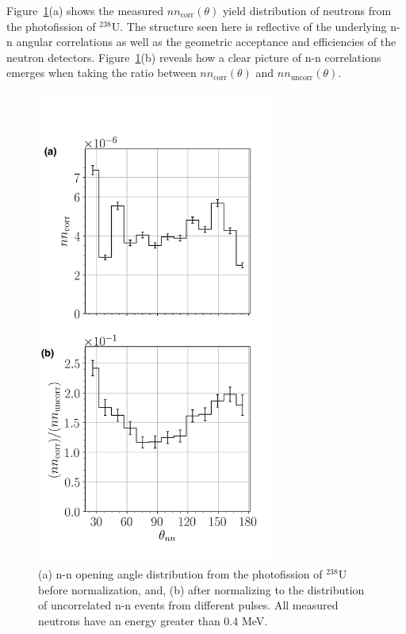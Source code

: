 Figure~\ref{fig:SPDPNormalization}(a) shows the measured $nn_{\text{corr}}(\theta)$ yield distribution of neutrons from the photofission of $^{238}$U.
The structure seen here is reflective of the underlying n-n angular correlations as well as the geometric acceptance and efficiencies of the neutron detectors.
Figure~\ref{fig:SPDPNormalization}(b) reveals how a clear picture of n-n correlations emerges when taking the ratio between $nn_{\text{corr}}(\theta)$ and $nn_{\text{uncorr}}(\theta)$.
\begin{figure}[]
\centering
    \includegraphics[width=0.7\textwidth]{Content/Methods/SPDPNormalization.png}
    \caption{(a) n-n opening angle distribution from the photofission of $^{238}$U before normalization, and, (b) after normalizing to the distribution of uncorrelated n-n events from different pulses.
    All measured neutrons have an energy greater than 0.4 MeV.}
    \label{fig:SPDPNormalization}
\end{figure}

